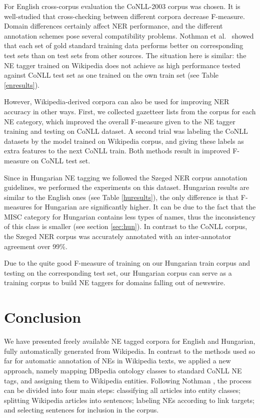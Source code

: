 \documentclass[11pt]{article}
\begin{document}
For English cross-corpus evaluation the CoNLL-2003 corpus was chosen. It is well-studied that cross-checking between different corpora decrease F-measure. Domain differences certainly affect NER performance, and the different annotation schemes pose several compatibility problems. Nothman et al.~ showed that each set of gold standard training data performs better on corresponding test sets than on test sets from other sources. The situation here is similar: the NE tagger trained on Wikipedia does not achieve as high performance tested against CoNLL test set as one trained on the own train set (see Table \ref{enresults}). 

However, Wikipedia-derived corpora can also be used for improving NER accuracy in other ways. First, we collected gazetteer lists from the corpus for each NE category, which improved the overall F-measure given to the NE tagger training and testing on CoNLL dataset. A second trial was labeling the CoNLL datasets by the model trained on Wikipedia corpus, and giving these labels as extra features to the next CoNLL train. Both methods result in improved F-measure on CoNLL test set.  

Since in Hungarian NE tagging we followed the Szeged NER corpus annotation guidelines, we performed the experiments on this dataset. Hungarian results are similar to the English ones (see Table \ref{huresults}), the only difference is that F-measures for Hungarian are significantly higher. It can be due to the fact that the MISC category for Hungarian contains less types of names, thus the inconsistency of this class is smaller (see section \ref{sec:hun}). In contrast to the CoNLL corpus, the Szeged NER corpus was accurately annotated with an inter-annotator agreement over 99\%.  

Due to the quite good F-measure of training on our Hungarian train corpus and testing on the corresponding test set, our Hungarian corpus can serve as a training corpus to build NE taggers for domains falling out of newswire. 

\section{Conclusion}
\label{sec:conclusion}

We have presented freely available NE tagged corpora for English and Hungarian, fully automatically generated from Wikipedia. In contrast to the methods used so far for automatic annotation of NEs in Wikipedia texts, we applied a new approach, namely mapping DBpedia ontology classes to standard CoNLL NE tags, and assigning them to Wikipedia entities. Following Nothman , the process can be divided into four main steps:  classifying all articles into entity classes; splitting Wikipedia articles into sentences; labeling NEs according to link targets; and selecting sentences for inclusion in the corpus. 
\end{document}
